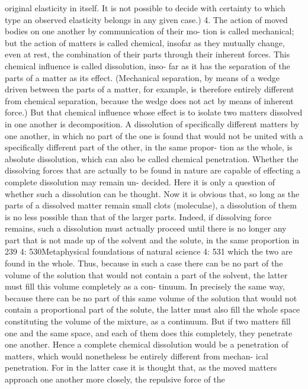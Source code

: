 original elasticity in itself. It is not possible to decide with certainty to
which type an observed elasticity belongs in any given case.)
4. The action of moved bodies on one another by communication of their mo-
tion is called mechanical; but the action of matters is called chemical, insofar
as they mutually change, even at rest, the combination of their parts through
their inherent forces. This chemical inﬂuence is called dissolution, inso-
far as it has the separation of the parts of a matter as its effect. (Mechanical
separation, by means of a wedge driven between the parts of a matter,
for example, is therefore entirely different from chemical separation,
because the wedge does not act by means of inherent force.) But that
chemical inﬂuence whose effect is to isolate two matters dissolved in one
another is decomposition. A dissolution of speciﬁcally different matters
by one another, in which no part of the one is found that would not be
united with a speciﬁcally different part of the other, in the same propor-
tion as the whole, is absolute dissolution, which can also be called chemical
penetration. Whether the dissolving forces that are actually to be found
in nature are capable of effecting a complete dissolution may remain un-
decided. Here it is only a question of whether such a dissolution can be
thought. Now it is obvious that, so long as the parts of a dissolved matter
remain small clots (moleculae), a dissolution of them is no less possible
than that of the larger parts. Indeed, if dissolving force remains, such a
dissolution must actually proceed until there is no longer any part that
is not made up of the solvent and the solute, in the same proportion in
239
4: 530Metaphysical foundations of natural science
4: 531
which the two are found in the whole. Thus, because in such a case there
can be no part of the volume of the solution that would not contain a
part of the solvent, the latter must ﬁll this volume completely as a con-
tinuum. In precisely the same way, because there can be no part of this
same volume of the solution that would not contain a proportional part
of the solute, the latter must also ﬁll the whole space constituting the
volume of the mixture, as a continuum. But if two matters ﬁll one and
the same space, and each of them does this completely, they penetrate one
another. Hence a complete chemical dissolution would be a penetration
of matters, which would nonetheless be entirely different from mechan-
ical penetration. For in the latter case it is thought that, as the moved
matters approach one another more closely, the repulsive force of the
